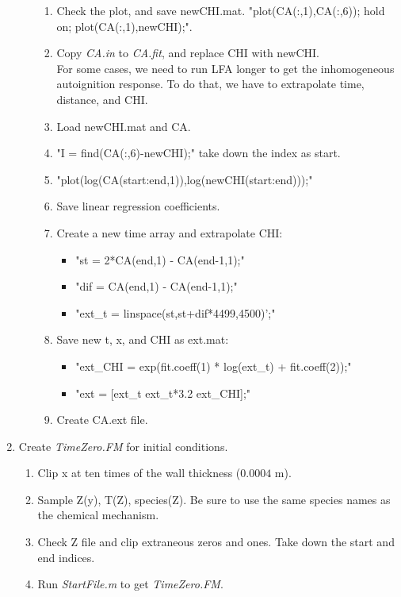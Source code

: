 \documentclass[11pt,english]{article}
\begin{document}
\begin{enumerate}
\begin{enumerate}
\begin{enumerate}
      \item Check the plot, and save newCHI.mat.  "plot(CA(:,1),CA(:,6)); hold on; plot(CA(:,1),newCHI);". 
      \item Copy \emph{CA.in} to \emph{CA.fit}, and replace CHI with newCHI.\\
      For some cases, we need to run LFA longer to get the inhomogeneous autoignition response.  To do that, we have to extrapolate time, distance, and CHI.
      \item Load newCHI.mat and CA.
      \item "I = find(CA(:,6)-newCHI);" take down the index as start.
      \item "plot(log(CA(start:end,1)),log(newCHI(start:end)));"
      \item Save linear regression coefficients.
      \item Create a new time array and extrapolate CHI:
        \begin{itemize}
          \item "st = 2*CA(end,1) - CA(end-1,1);"
          \item "dif = CA(end,1) - CA(end-1,1);"
          \item "ext\_t = linspace(st,st+dif*4499,4500)';"
        \end{itemize}
      \item Save new t, x, and CHI as ext.mat:
        \begin{itemize}
          \item "ext\_CHI = exp(fit.coeff(1) * log(ext\_t) + fit.coeff(2));"
          \item "ext = [ext\_t ext\_t*3.2 ext\_CHI];"
        \end{itemize}
      \item Create CA.ext file.
    \end{enumerate}
  \end{enumerate}
  \item Create \emph{TimeZero.FM} for initial conditions.
  \begin{enumerate}
    \item Clip x at ten times of the wall thickness ($0.0004$ m).  
    \item Sample Z(y), T(Z), species(Z).  Be sure to use the same species names as the chemical mechanism.
    \item Check Z file and clip extraneous zeros and ones.  Take down the start and end indices.
    \item Run \emph{StartFile.m} to get \emph{TimeZero.FM}.

\end{enumerate}
\end{enumerate}
\end{document}
